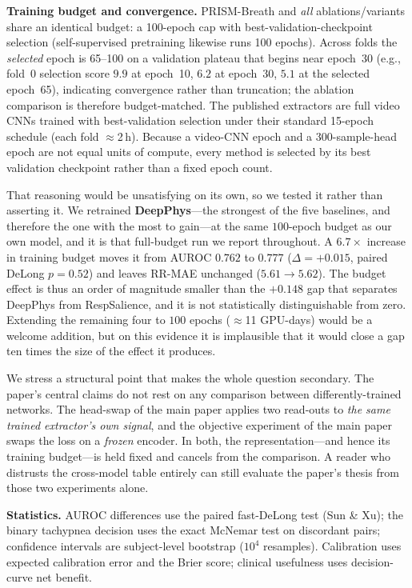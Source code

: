 \documentclass[journal]{IEEEtran}
\begin{document}
\textbf{Training budget and convergence.} PRISM-Breath and \emph{all} ablations/variants share an
identical budget: a 100-epoch cap with best-validation-checkpoint selection (self-supervised pretraining
likewise runs 100 epochs). Across folds the \emph{selected} epoch is 65--100 on a validation plateau that
begins near epoch~30 (e.g., fold~0 selection score $9.9$ at epoch~10, $6.2$ at epoch~30, $5.1$ at the
selected epoch~65), indicating convergence rather than truncation; the ablation comparison is therefore
budget-matched. The published extractors are full video CNNs trained with best-validation selection under
their standard 15-epoch schedule (each fold $\approx$2\,h). Because a video-CNN epoch and a
300-sample-head epoch are not equal units of compute, every method is selected by its best validation
checkpoint rather than a fixed epoch count.

That reasoning would be unsatisfying on its own, so we tested it rather than asserting it. We retrained
\textbf{DeepPhys}---the strongest of the five baselines, and therefore the one with the most to gain---at
the same $100$-epoch budget as our own model, and it is that full-budget run we report throughout.
A $6.7\times$ increase in training budget moves it from AUROC $0.762$ to $0.777$
($\Delta{=}{+}0.015$, paired DeLong $p=0.52$) and leaves RR-MAE unchanged ($5.61 \to 5.62$). The budget
effect is thus an order of magnitude smaller than the $+0.148$ gap that separates DeepPhys from
RespSalience, and it is not statistically distinguishable from zero. Extending the remaining four to
$100$ epochs ($\approx$11 GPU-days) would be a welcome addition, but on this evidence it is implausible
that it would close a gap ten times the size of the effect it produces.

We stress a structural point that makes the whole question secondary. The paper's central claims do
not rest on any comparison between differently-trained networks. The head-swap of the main paper
applies two read-outs to \emph{the same trained extractor's own signal}, and
the objective experiment of the main paper swaps the loss on a \emph{frozen} encoder. In both,
the representation---and hence its training budget---is held fixed and cancels from the comparison. A
reader who distrusts the cross-model table entirely can still evaluate the paper's thesis from those
two experiments alone.

\textbf{Statistics.} AUROC differences use the paired fast-DeLong test (Sun \& Xu); the binary tachypnea
decision uses the exact McNemar test on discordant pairs; confidence intervals are subject-level bootstrap
($10^{4}$ resamples). Calibration uses expected calibration error and the Brier score; clinical usefulness
uses decision-curve net benefit.
\end{document}
